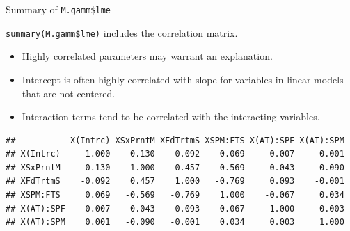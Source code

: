 \documentclass[
  ignorenonframetext,
]{beamer}
\newenvironment{Shaded}{\begin{snugshade}}{\end{snugshade}}
\newcommand{\DataTypeTok}[1]{\textcolor[rgb]{0.13,0.29,0.53}{#1}}
\newcommand{\DecValTok}[1]{\textcolor[rgb]{0.00,0.00,0.81}{#1}}
\newcommand{\KeywordTok}[1]{\textcolor[rgb]{0.13,0.29,0.53}{\textbf{#1}}}
\newcommand{\NormalTok}[1]{#1}
\newcommand{\OperatorTok}[1]{\textcolor[rgb]{0.81,0.36,0.00}{\textbf{#1}}}
\newcommand{\StringTok}[1]{\textcolor[rgb]{0.31,0.60,0.02}{#1}}
\providecommand{\tightlist}{%
  \setlength{\itemsep}{0pt}\setlength{\parskip}{0pt}}
\begin{document}
\begin{frame}[fragile]{Summary of \texttt{M.gamm\$lme}}
\protect\hypertarget{summary-of-m.gammlme}{}

\texttt{summary(M.gamm\$lme)} includes the correlation matrix.

\begin{itemize}
\tightlist
\item
  Highly correlated parameters may warrant an explanation.
\item
  Intercept is often highly correlated with slope for variables in
  linear models that are not centered.
\item
  Interaction terms tend to be correlated with the interacting
  variables.
\end{itemize}

\scriptsize

\begin{Shaded}
\end{Shaded}

\begin{verbatim}
##           X(Intrc) XSxPrntM XFdTrtmS XSPM:FTS X(AT):SPF X(AT):SPM
## X(Intrc)     1.000   -0.130   -0.092    0.069     0.007     0.001
## XSxPrntM    -0.130    1.000    0.457   -0.569    -0.043    -0.090
## XFdTrtmS    -0.092    0.457    1.000   -0.769     0.093    -0.001
## XSPM:FTS     0.069   -0.569   -0.769    1.000    -0.067     0.034
## X(AT):SPF    0.007   -0.043    0.093   -0.067     1.000     0.003
## X(AT):SPM    0.001   -0.090   -0.001    0.034     0.003     1.000
\end{verbatim}

\end{frame}
\end{document}
